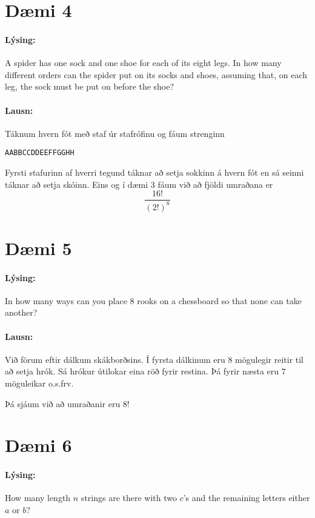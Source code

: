 \documentclass[a4paper,notitlepage]{article}
\theoremstyle{plain}
\theoremstyle{definition}
\begin{document}
\section*{Dæmi 4}
\paragraph{Lýsing:} A spider has one sock and one shoe for each of its eight legs. In how many different orders can the spider put on its socks and shoes, assuming that, on each leg, the sock must be put on before the shoe?

\paragraph{Lausn:}
Táknum hvern fót með staf úr stafrófinu og fáum strenginn
\begin{center}
    \texttt{AABBCCDDEEFFGGHH}
\end{center}
Fyrsti stafurinn af hverri tegund táknar að setja sokkinn á hvern fót en sá seinni táknar að setja skóinn. Eins og í dæmi $3$ fáum við að fjöldi umraðana er
\begin{equation*}
    \frac{16!}{(2!)^{8}}
\end{equation*}

\newpage

\section*{Dæmi 5}
\paragraph{Lýsing:} In how many ways can you place $8$ rooks on a chessboard so that none can take another?

\paragraph{Lausn:}
Við förum eftir dálkum skákborðsins. Í fyrsta dálkinum eru $8$ mögulegir reitir til að setja hrók. Sá hrókur útilokar eina röð fyrir restina. Þá fyrir næsta eru $7$ möguleikar o.s.frv.

Þá sjáum við að umraðanir eru $8!$

\section*{Dæmi 6}
\paragraph{Lýsing:} How many length $n$ strings are there with two $c$'s and the remaining letters either $a$ or $b$?
\end{document}
